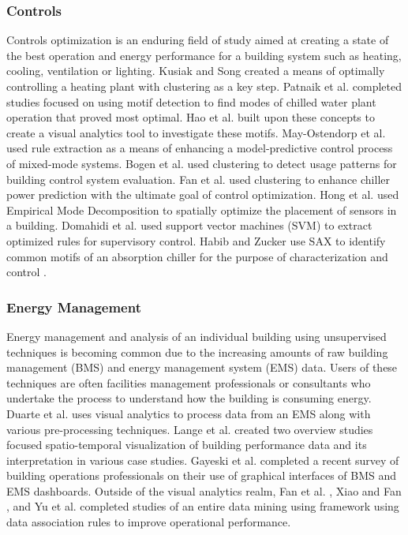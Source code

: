 \subsubsection{Controls}
Controls optimization is an enduring field of study aimed at creating a state of the best operation and energy performance for a building system such as heating, cooling, ventilation or lighting. Kusiak and Song \cite{kusiak_clustering-based_2008} created a means of optimally controlling a heating plant with clustering as a key step. Patnaik et al. \cite{patnaik_data_2010,patnaik_sustainable_2009} completed studies focused on using motif detection to find modes of chilled water plant operation that proved most optimal. Hao et al. \cite{hao_visualizing_2011} built upon these concepts to create a visual analytics tool to investigate these motifs. May-Ostendorp et al. \cite{may-ostendorp_model-predictive_2011,may-ostendorp_extraction_2013} used rule extraction as a means of enhancing a model-predictive control process of mixed-mode systems. Bogen et al. \cite{bogen_evaluating_2013} used clustering to detect usage patterns for building control system evaluation. Fan et al. \cite{fan_prediction_2013} used clustering to enhance chiller power prediction with the ultimate goal of control optimization. Hong et al. \cite{hong_towards_2013} used Empirical Mode Decomposition to spatially optimize the placement of sensors in a building. Domahidi et al. \cite{domahidi_learning_2014} used support vector machines (SVM) to extract optimized rules for supervisory control. Habib and Zucker use SAX to identify common motifs of an absorption chiller for the purpose of characterization and control \cite{habib_finding_2015}.

\subsubsection{Energy Management}
Energy management and analysis of an individual building using unsupervised techniques is becoming common due to the increasing amounts of raw building management (BMS) and energy management system (EMS) data. Users of these techniques are often facilities management professionals or consultants who undertake the process to understand how the building is consuming energy. Duarte et al. \cite{duarte_prioritizing_2011} uses visual analytics to process data from an EMS along with various pre-processing techniques. Lange et al. \cite{lange_energy_2012,lange_discovering_2013} created two overview studies focused spatio-temporal visualization of building performance data and its interpretation in various case studies. Gayeski et al. \cite{gayeski_data_2015} completed a recent survey of building operations professionals on their use of graphical interfaces of BMS and EMS dashboards. Outside of the visual analytics realm, Fan et al. \cite{fan_temporal_2015}, Xiao and Fan \cite{xiao_data_2014}, and Yu et al. \cite{yu_extracting_2013} completed studies of an entire data mining using framework using data association rules to improve operational performance.